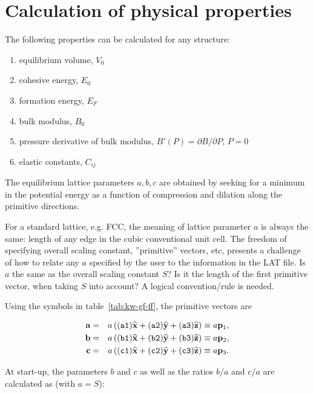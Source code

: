 \documentclass[a4paper,12pt,onecolumn]{article}
\def\a{\mathbf{a}}
\def\b{\mathbf{b}}
\def\cc{\mathbf{c}}
\def\p{\mathbf{p}}
\def\xhat{\mathbf{\widehat{x}}}
\def\yhat{\mathbf{\widehat{y}}}
\def\zhat{\mathbf{\widehat{z}}}
\begin{document}
\section{Calculation of physical properties}


The following properties can be calculated for any structure:

\begin{enumerate}
\item equilibrium volume, $V_0$
\item cohesive energy, $E_0$
\item formation energy, $E_F$
\item bulk modulus, $B_0$
\item pressure derivative of bulk modulus, $B'(P) = \partial B/\partial P$, $P=0$
\item elastic constants, $C_{ij}$
\end{enumerate}

The equilibrium lattice parameters $a, b, c$ are obtained by
seeking for a minimum in the potential energy as a function
of compression and dilation along the primitive directions.


For a standard lattice, e.g. FCC, the meaning of lattice parameter $a$ is
always the same: length of any edge in the cubic conventional unit cell.
The freedom of specifying overall scaling constant, ''primitive'' vectors, etc,
presents a challenge of how to relate any $a$ specified by the user to
the information in the LAT file. Is $a$ the same as the overall scaling
constant $S$? Is it the length of the first primitive vector, when taking
$S$ into account? A logical convention/rule is needed.








Using the symbols in table~\ref{tab:kw-gf-ff}, the primitive vectors are

\begin{eqnarray}
\a  &=& a \left( (\verb+a1+) \xhat + (\verb+a2+) \yhat + (\verb+a3+) \zhat \right) \equiv a \p_1, \\
\b  &=& a \left( (\verb+b1+) \xhat + (\verb+b2+) \yhat + (\verb+b3+) \zhat \right) \equiv a \p_2, \\
\cc &=& a \left( (\verb+c1+) \xhat + (\verb+c2+) \yhat + (\verb+c3+) \zhat \right) \equiv a \p_3.
\end{eqnarray}

At start-up, the parameters $b$ and $c$ as well as the ratios $b/a$ and $c/a$ are
calculated as (with $a = S$):
\end{document}
